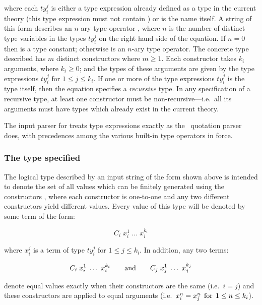 \noindent where each $ty_i^{j}$ is either a type expression already defined
as a type in the current theory (this type expression must not
contain ) or is the name  itself.  A string of this form
describes an $n$-ary type operator ,
where $n$ is the number of distinct type variables in the types
$ty_i^{j}$ on the right hand side of the equation.
If $n = 0$ then  is a type constant;
otherwise  is an $n$-ary type operator.  The concrete
type described has $m$
distinct constructors  where $m \geq 1$.
Each constructor  takes $k_i$ arguments, where $k_i \geq 0$;
and the types of these arguments are given by the type
expressions $ty_i^j$ for $1 \leq j \leq k_i$.  If one or more of the type
expressions $ty_i^{j}$ is the type  itself, then the \mbox{equation}
specifies a {\it recursive\/} type.  In any specification of a recursive type,
at least one constructor must be non-recursive---i.e.\ all its arguments must
have types which already exist in the current theory.

The input parser for  treats type expressions exactly as the
\HOL\ quotation parser does, with precedences among the various built-in type
operators in force.

\subsubsection{The type specified}

The logical type described by an input string of the form
shown above is intended
to denote the set of all values which can be finitely
generated using the constructors ,
where each constructor is one-to-one and any two
different constructors yield different values.   Every value of this
type will be denoted by some term of the form:

\[ C_i\;x_i^1\;\ldots\;x_i^{k_i} \]

\noindent where $x_i^j$ is a term of type $ty_i^j$ for $1 \leq j \leq
k_i$. In addition, any two terms:

\[ C_i\;x_i^1\;\ldots\;x_i^{k_i} \qquad {\rm and} \qquad
   C_j\;x_j^1\;\ldots\;x_j^{k_j} \]

\noindent denote equal values exactly when their constructors are the same
(i.e.\ $i=j$) and these constructors are applied to equal arguments
(i.e.\ $x_i^n = x_j^n\;\,{\rm for}\;\,1\leq n\leq k_i$).

